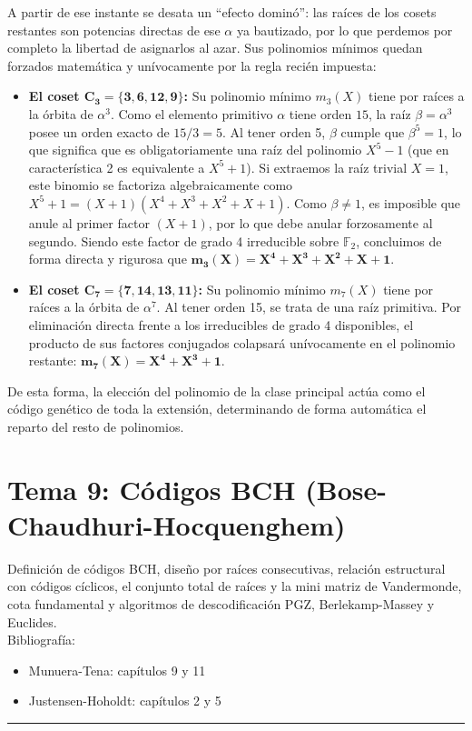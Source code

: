 \documentclass{article}
\newcommand{\hlinecolor}{\noindent\textcolor{azuloscuro}{\rule{\textwidth}{1pt}}}
\begin{document}
A partir de ese instante se desata un ``efecto dominó'': las raíces de los cosets restantes son potencias directas de ese $\alpha$ ya bautizado, por lo que perdemos por completo la libertad de asignarlos al azar. Sus polinomios mínimos quedan forzados matemática y unívocamente por la regla recién impuesta:
\begin{itemize}
    \item \textbf{El coset $\mathbf{C_3 = \{3, 6, 12, 9\}}$:} Su polinomio mínimo $m_3(X)$ tiene por raíces a la órbita de $\alpha^3$. Como el elemento primitivo $\alpha$ tiene orden $15$, la raíz $\beta = \alpha^3$ posee un orden exacto de $15/3 = 5$. Al tener orden 5, $\beta$ cumple que $\beta^5 = 1$, lo que significa que es obligatoriamente una raíz del polinomio $X^5 - 1$ (que en característica 2 es equivalente a $X^5 + 1$). Si extraemos la raíz trivial $X=1$, este binomio se factoriza algebraicamente como $X^5 + 1 = (X+1)(X^4 + X^3 + X^2 + X + 1)$. Como $\beta \neq 1$, es imposible que anule al primer factor $(X+1)$, por lo que debe anular forzosamente al segundo. Siendo este factor de grado 4 irreducible sobre $\mathbb{F}_2$, concluimos de forma directa y rigurosa que $\mathbf{m_3(X) = X^4 + X^3 + X^2 + X + 1}$.
    \item \textbf{El coset $\mathbf{C_7 = \{7, 14, 13, 11\}}$:} Su polinomio mínimo $m_7(X)$ tiene por raíces a la órbita de $\alpha^7$. Al tener orden 15, se trata de una raíz primitiva. Por eliminación directa frente a los irreducibles de grado 4 disponibles, el producto de sus factores conjugados colapsará unívocamente en el polinomio restante: $\mathbf{m_7(X) = X^4 + X^3 + 1}$.
\end{itemize}
De esta forma, la elección del polinomio de la clase principal actúa como el código genético de toda la extensión, determinando de forma automática el reparto del resto de polinomios.

\newpage

\section{Tema 9: Códigos BCH (Bose-Chaudhuri-Hocquenghem)}
Definición de códigos BCH, diseño por raíces consecutivas, relación estructural con códigos cíclicos, el conjunto total de raíces y la mini matriz de Vandermonde, cota fundamental y algoritmos de descodificación PGZ, Berlekamp-Massey y Euclides.\\
Bibliografía:
\begin{itemize}
\item Munuera-Tena: capítulos 9 y 11
\item Justensen-Hoholdt: capítulos 2 y 5
\end{itemize}
\hlinecolor{}
\vspace{0.5cm}
\end{document}
